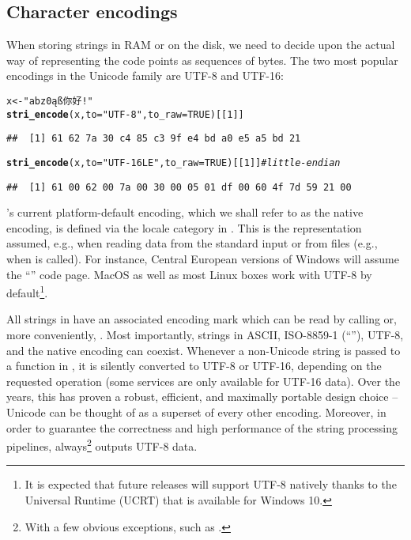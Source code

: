 \documentclass[nojss]{jss}\usepackage[]{graphicx}\usepackage[]{xcolor}
\makeatletter
\newcommand{\hlnum}[1]{\textcolor[rgb]{0.686,0.059,0.569}{#1}}%
\newcommand{\hlstr}[1]{\textcolor[rgb]{0.192,0.494,0.8}{#1}}%
\newcommand{\hlcom}[1]{\textcolor[rgb]{0.678,0.584,0.686}{\textit{#1}}}%
\newcommand{\hlstd}[1]{\textcolor[rgb]{0.345,0.345,0.345}{#1}}%
\newcommand{\hlkwb}[1]{\textcolor[rgb]{0.69,0.353,0.396}{#1}}%
\newcommand{\hlkwc}[1]{\textcolor[rgb]{0.333,0.667,0.333}{#1}}%
\newcommand{\hlkwd}[1]{\textcolor[rgb]{0.737,0.353,0.396}{\textbf{#1}}}%
\newenvironment{kframe}{%
 \def\at@end@of@kframe{}%
 \ifinner\ifhmode%
  \def\at@end@of@kframe{\end{minipage}}%
  \begin{minipage}{\columnwidth}%
 \fi\fi%
 \def\FrameCommand##1{\hskip\@totalleftmargin \hskip-\fboxsep
 \colorbox{shadecolor}{##1}\hskip-\fboxsep
     \hskip-\linewidth \hskip-\@totalleftmargin \hskip\columnwidth}%
 \MakeFramed {\advance\hsize-\width
   \@totalleftmargin\z@ \linewidth\hsize
   \@setminipage}}%
 {\par\unskip\endMakeFramed%
 \at@end@of@kframe}
\newenvironment{knitrout}{}{} %
\makeatother
\begin{document}
\subsection{Character encodings}\label{Sec:encoding}

When storing strings in RAM or on the disk,
we need to decide upon the actual way
of representing the code points as sequences of bytes.
The two most popular encodings in the Unicode family are
UTF-8 and UTF-16:

\begin{knitrout}
\color{fgcolor}\begin{kframe}
\begin{alltt}
\hlstd{x} \hlkwb{<-} \hlstr{"abz0ąß你好!"}
\hlkwd{stri_encode}\hlstd{(x,} \hlkwc{to}\hlstd{=}\hlstr{"UTF-8"}\hlstd{,} \hlkwc{to_raw}\hlstd{=}\hlnum{TRUE}\hlstd{)[[}\hlnum{1}\hlstd{]]}
\end{alltt}
\begin{verbatim}
##  [1] 61 62 7a 30 c4 85 c3 9f e4 bd a0 e5 a5 bd 21
\end{verbatim}
\begin{alltt}
\hlkwd{stri_encode}\hlstd{(x,} \hlkwc{to}\hlstd{=}\hlstr{"UTF-16LE"}\hlstd{,} \hlkwc{to_raw}\hlstd{=}\hlnum{TRUE}\hlstd{)[[}\hlnum{1}\hlstd{]]}  \hlcom{# little-endian}
\end{alltt}
\begin{verbatim}
##  [1] 61 00 62 00 7a 00 30 00 05 01 df 00 60 4f 7d 59 21 00
\end{verbatim}
\end{kframe}
\end{knitrout}

's current platform-default encoding, which we shall
refer to as the native encoding, is defined via the
 locale category in
. This is the representation assumed,
e.g., when reading data from the standard input
or from files (e.g., when  is called).
For instance, Central European versions of Windows will assume
the ``'' code page.
MacOS as well as most Linux boxes work with UTF-8 by default\footnote{
It is expected that future  releases will support UTF-8 natively
thanks to the Universal  Runtime (UCRT) that is available for Windows 10.}.

All strings in  have an associated encoding mark
which can be read by calling  or, more conveniently,
.
Most importantly, strings in ASCII, ISO-8859-1 (``''),
UTF-8, and the native encoding can coexist.
Whenever a non-Unicode string is passed to a function in ,
it is silently converted to UTF-8 or UTF-16, depending on the requested
operation (some  services are only available for {UTF-16} data).
Over the years, this has proven a robust, efficient, and maximally portable
design choice -- Unicode can be thought of as a superset of every other encoding.
Moreover, in order to guarantee the correctness and high performance of
the string processing pipelines,  always\footnote{With a few
obvious exceptions, such as .} outputs
UTF-8 data.
\end{document}
